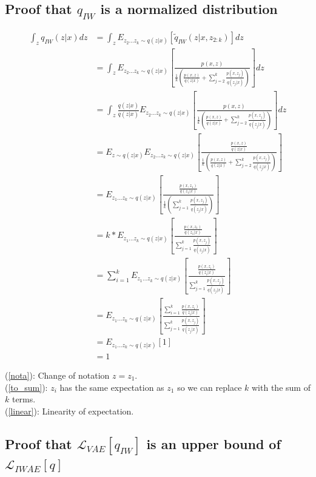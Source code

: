 \documentclass{article} %
\begin{document}
\subsection{Proof that \texorpdfstring{$q_{IW}$}{} is a normalized distribution}
\label{proof_norm}

\begin{align} 
    \int_z q_{IW}(z|x) dz
    &= \int_z E_{z_{2}...z_{k} \sim q(z|x)} \left[ \tilde{q}_{IW}(z|x,z_{2:k}) \right] dz \\
    &= \int_z E_{z_{2}...z_{k} \sim q(z|x)} \left[ \frac{p(x,z)}{  \frac{1}{k} \left( \frac{p(x,z)}{q(z|x)}+ \sum_{j=2}^k \frac{p(x,z_j)}{q(z_j|x)} \right) } \right] dz\\
    &= \int_z \frac{q(z|x)}{q(z|x)}E_{z_{2}...z_{k} \sim q(z|x)} \left[ \frac{p(x,z)}{  \frac{1}{k} \left( \frac{p(x,z)}{q(z|x)}+ \sum_{j=2}^k \frac{p(x,z_j)}{q(z_j|x)} \right) } \right] dz\\
    &= E_{z \sim q(z|x)} E_{z_{2}...z_{k} \sim q(z|x)} \left[ \frac{\frac{p(x,z)}{q(z|x)}}{  \frac{1}{k} \left( \frac{p(x,z)}{q(z|x)}+ \sum_{j=2}^k \frac{p(x,z_j)}{q(z_j|x)} \right) } \right] \\
    &= E_{z_{1}...z_{k} \sim q(z|x)} \left[ \frac{\frac{p(x,z_1)}{q(z_1|x)}}{  \frac{1}{k} \left( \sum_{j=1}^k \frac{p(x,z_j)}{q(z_j|x)} \right) } \right] \label{nota} \\
    &= k*E_{z_{1}...z_{k} \sim q(z|x)} \left[ \frac{\frac{p(x,z_1)}{q(z_1|x)}}{   \sum_{j=1}^k \frac{p(x,z_j)}{q(z_j|x)}  } \right]\\
    &= \sum_{i=1}^{k} E_{z_{1}...z_{k} \sim q(z|x)} \left[ \frac{\frac{p(x,z_i)}{q(z_i|x)}}{   \sum_{j=1}^k \frac{p(x,z_j)}{q(z_j|x)}  } \right] \label{to_sum} \\
    &= E_{z_{1}...z_{k} \sim q(z|x)} \left[ \frac{\sum_{i=1}^k \frac{p(x,z_i)}{q(z_i|x)}}{   \sum_{j=1}^k \frac{p(x,z_j)}{q(z_j|x)}  } \right] \label{linear} \\
    &= E_{z_{1}...z_{k} \sim q(z|x)} \left[1 \right] \\
    &= 1
\end{align}


(\ref{nota}): Change of notation $z = z_1$. \\
(\ref{to_sum}): $z_i$ has the same expectation as $z_1$ so we can replace $k$ with the sum of $k$ terms. \\
(\ref{linear}): Linearity of expectation.

\newpage

\subsection{Proof that \texorpdfstring{$\mathcal{L}_{VAE}[q_{IW}]$}{} is an upper bound of \texorpdfstring{$\mathcal{L}_{IWAE}[q]$}{}}
\label{qeiw_proof}
\end{document}

